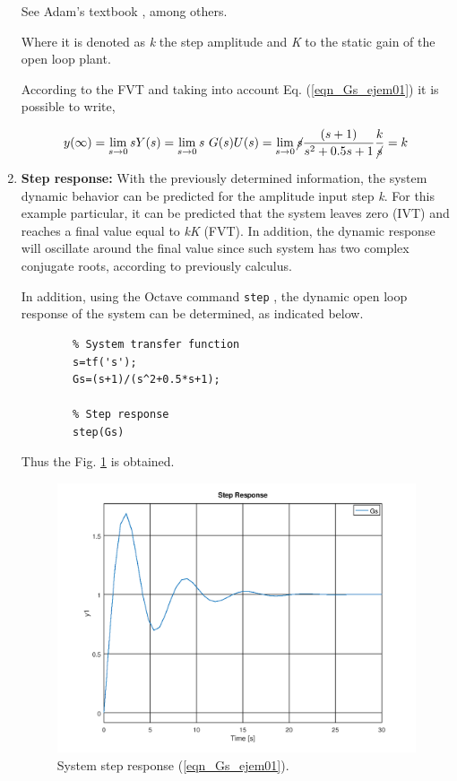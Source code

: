 \begin{enumerate}
\begin{remark}
			\begin{demo}
				See Adam's textbook \cite{Adam2018}, among others.
			\end{demo}
		\end{remark}
	
		Where it is denoted as \textit{k} the step amplitude  and \textit{K} to the static gain  of the open loop plant.
		
		\vspace{0.4cm}
		According to the FVT and taking into account Eq. (\ref{eqn_Gs_ejem01}) it is possible to write,
		
		\begin{equation*} 
			y(\infty)= \lim _{s \to 0} s Y(s) = \lim _{s \to 0} s \ G(s)U(s) = \lim _{s \to 0} \cancel{s} \frac{(s+1)}{s^2+0.5s+1} \frac{k}{\cancel{s}} =  k
		\end{equation*}
		
		\item \textbf{Step response:}
		With the previously determined information, the system dynamic behavior  can be predicted for the amplitude input step \textit{k}. For this example particular, it can be predicted that the system leaves zero (IVT) and reaches a final value equal to \textit{kK} (FVT). In addition, the dynamic response will oscillate around the final value since such system has two complex conjugate roots, according to  previously calculus.
		
		
		In addition, using the Octave command \texttt{step} , the dynamic open loop response of the system can be determined, as indicated below.
		
		\begin{verbatim}
		% System transfer function
		s=tf('s');
		Gs=(s+1)/(s^2+0.5*s+1);
		
		% Step response
		step(Gs)
		\end{verbatim}
		
		Thus the Fig. \ref{chp_la_fig03_step} is obtained.
		
		\begin{figure}[H]
			\centering
			\includegraphics[scale=0.55]{./m/chapter_la/stepGs_ltitool.png}
			\caption{System step response (\ref{eqn_Gs_ejem01}).}
			\label{chp_la_fig03_step}
		\end{figure}


\end{enumerate}
